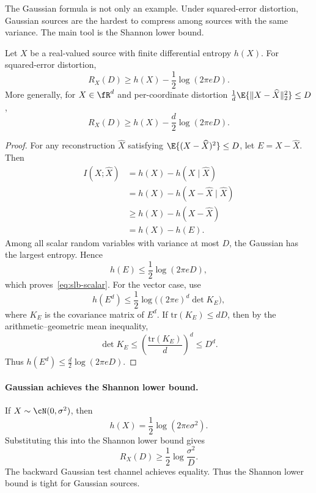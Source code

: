The Gaussian formula is not only an example.
Under squared-error distortion, Gaussian sources are the hardest to compress among sources with the same variance.
The main tool is the Shannon lower bound.

\begin{theorem}
\label{thm:slb}
Let $X$ be a real-valued source with finite differential entropy $h(X)$.
For squared-error distortion,
\begin{equation}
    R_X(D)\ge h(X)-\frac12\log(2\pi eD).
    \label{eq:slb-scalar}
\end{equation}
More generally, for $X\in\fR^d$ and per-coordinate distortion
$\frac1d\E{\|X-\widehat X\|_2^2}\le D$,
\begin{equation}
    R_X(D)\ge h(X)-\frac d2\log(2\pi eD).
    \label{eq:slb-vector}
\end{equation}
\end{theorem}

\begin{proof}
For any reconstruction $\widehat X$ satisfying $\E{(X-\widehat X)^2}\le D$,
let $E=X-\widehat X$.
Then
\begin{align}
I(X;\widehat X)
&=h(X)-h(X\mid \widehat X) \\
&=h(X)-h(X-\widehat X\mid \widehat X) \\
&\ge h(X)-h(X-\widehat X) \\
&=h(X)-h(E).
\end{align}
Among all scalar random variables with variance at most $D$, the Gaussian has the largest entropy.
Hence
\[
    h(E)\le \frac12\log(2\pi eD),
\]
which proves~\eqref{eq:slb-scalar}.
For the vector case, use
\[
    h(E^d)\le \frac12\log\bigl((2\pi e)^d\det K_E\bigr),
\]
where $K_E$ is the covariance matrix of $E^d$.
If $\mathrm{tr}(K_E)\le dD$, then by the arithmetic--geometric mean inequality,
\[
    \det K_E\le \left(\frac{\mathrm{tr}(K_E)}{d}\right)^d\le D^d.
\]
Thus $h(E^d)\le \frac d2\log(2\pi eD)$.
\end{proof}

\paragraph{Gaussian achieves the Shannon lower bound.}
If $X\sim\cN(0,\sigma^2)$, then
\[
    h(X)=\frac12\log(2\pi e\sigma^2).
\]
Substituting this into the Shannon lower bound gives
\[
    R_X(D)\ge \frac12\log\frac{\sigma^2}{D}.
\]
The backward Gaussian test channel achieves equality.
Thus the Shannon lower bound is tight for Gaussian sources.

